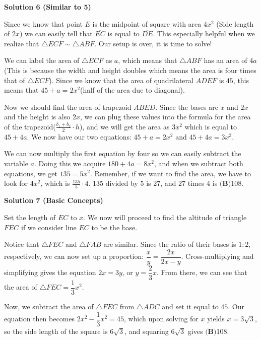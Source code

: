 \begin{enumerate}
\textbf{Solution 6 (Similar to 5)}

Since we know that point $E$ is the midpoint of square with area $4x^2$ (Side length of $2x$) we can easily tell that $\overline{EC}$ is equal to $\overline{DE}$. This especially helpful when we realize that $\triangle ECF\sim \triangle ABF$. Our setup is over, it is time to solve! 

 We can label the area of $\triangle ECF$ as $a$, which means that $\triangle ABF$ has an area of $4a$ (This is because the width and height doubles which means the area is four times that of $\triangle ECF$). Since we know that the area of quadrilateral $ADEF$ is $45$, this means that $45+a=2x^2$(half of the area due to diagonal). 

 Now we should find the area of trapezoid $ABED$. Since the bases are $x$ and $2x$ and the height is also $2x$, we can plug these values into the formula for the area of the trapezoid($\frac{b_{1}+b_{2}}{2}\cdot h$), and we will get the area as $3x^2$ which is equal to $45+4a$. We now have our two equations: $45+a=2x^2$ and $45+4a=3x^3$.

 We can now multiply the first equation by four so we can easily subtract the variable $a$. Doing this we acquire $180+4a=8x^2$, and when we subtract both equations, we get $135=5x^2$. Remember, if we want to find the area, we have to look for $4x^2$, which is $\frac{135}{5} \cdot 4$. 135 divided by 5 is 27, and 27 times 4 is  $\boxed{\textbf{(B)}108}$.

 


 



\textbf{Solution 7 (Basic Concepts)}

Set the length of $EC$ to $x$. We now will proceed to find the altitude of triangle $FEC$ if we consider line $EC$ to be the base.

 Notice that $\triangle FEC$ and $\triangle FAB$ are similar. Since the ratio of their bases is $1:2$, respectively, we can now set up a proportion: $\dfrac{x}{y}=\dfrac{2x}{2x-y}$. Cross-multiplying and simplifying gives the equation $2x=3y$, or $y=\dfrac{2}{3}x$. From there, we can see that the area of $\triangle FEC = \dfrac{1}{3}x^2$.

 Now, we subtract the area of $\triangle FEC$ from $\triangle ADC$ and set it equal to $45$. Our equation then becomes $2x^2-\dfrac{1}{3}x^2=45$, which upon solving for $x$ yields $x=3\sqrt{3}$, so the side length of the square is $6\sqrt{3}$, and squaring $6\sqrt{3}$ gives $\boxed{\textbf{(B)}108}$.


\end{enumerate}
